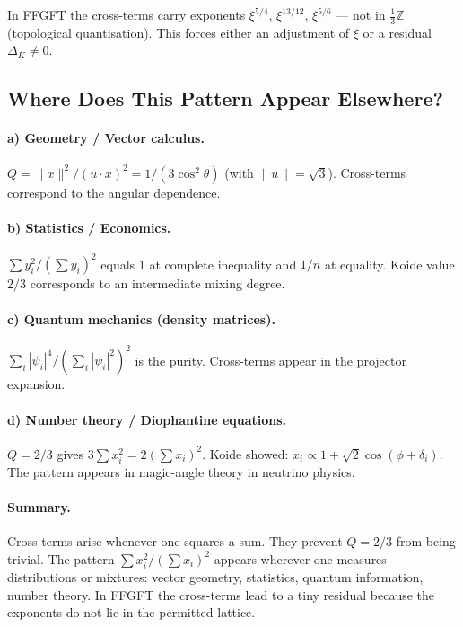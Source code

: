 In FFGFT the cross-terms carry exponents $\xi^{5/4}$, $\xi^{13/12}$, $\xi^{5/6}$
--- not in $\tfrac{1}{3}\mathbb{Z}$ (topological quantisation). This forces
either an adjustment of $\xi$ or a residual $\Delta_K\neq0$.

\subsection{Where Does This Pattern Appear Elsewhere?}

\paragraph{a) Geometry / Vector calculus.}
$Q=\|x\|^2/(u\cdot x)^2=1/(3\cos^2\theta)$ (with $\|u\|=\sqrt{3}$).
Cross-terms correspond to the angular dependence.

\paragraph{b) Statistics / Economics.}
$\sum y_i^2/(\sum y_i)^2$ equals 1 at complete inequality and $1/n$ at equality.
Koide value $2/3$ corresponds to an intermediate mixing degree.

\paragraph{c) Quantum mechanics (density matrices).}
$\sum_i|\psi_i|^4/(\sum_i|\psi_i|^2)^2$ is the purity.
Cross-terms appear in the projector expansion.

\paragraph{d) Number theory / Diophantine equations.}
$Q=2/3$ gives $3\sum x_i^2=2(\sum x_i)^2$.
Koide showed: $x_i\propto1+\sqrt{2}\cos(\phi+\delta_i)$.
The pattern appears in magic-angle theory in neutrino physics.

\paragraph{Summary.}
Cross-terms arise whenever one squares a sum.
They prevent $Q=2/3$ from being trivial.
The pattern $\sum x_i^2/(\sum x_i)^2$ appears wherever one measures
distributions or mixtures: vector geometry, statistics, quantum information, number theory.
In FFGFT the cross-terms lead to a tiny residual because the exponents do not lie
in the permitted lattice.

